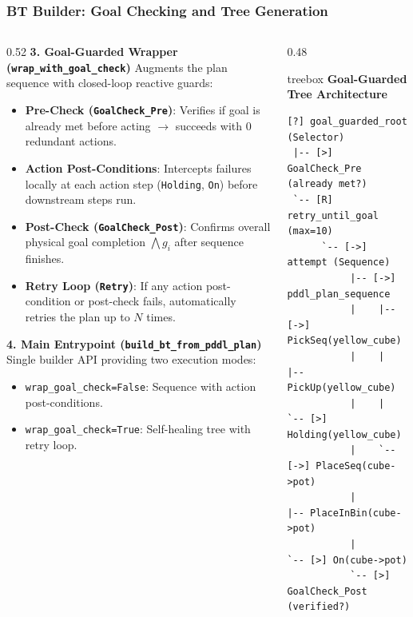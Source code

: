 \documentclass[10pt]{beamer}
\begin{document}
\begin{frame}[fragile]
\frametitle{BT Builder: Goal Checking and Tree Generation}
\begin{columns}[T]
    \begin{column}{0.52\textwidth}
        \small \textbf{3. Goal-Guarded Wrapper (\texttt{wrap\_with\_goal\_check})}
        \scriptsize
        Augments the plan sequence with closed-loop reactive guards:
        \begin{itemize}
            \item \textbf{Pre-Check (\texttt{GoalCheck\_Pre})}: Verifies if goal is already met before acting $\to$ succeeds with $0$ redundant actions.
            \item \textbf{Action Post-Conditions}: Intercepts failures locally at each action step (\texttt{Holding}, \texttt{On}) before downstream steps run.
            \item \textbf{Post-Check (\texttt{GoalCheck\_Post})}: Confirms overall physical goal completion $\bigwedge g_i$ after sequence finishes.
            \item \textbf{Retry Loop (\texttt{Retry})}: If any action post-condition or post-check fails, automatically retries the plan up to $N$ times.
        \end{itemize}

        \vspace{0.10cm}
        \small \textbf{4. Main Entrypoint (\texttt{build\_bt\_from\_pddl\_plan})}
        \scriptsize
        Single builder API providing two execution modes:
        \begin{itemize}
            \item \texttt{wrap\_goal\_check=False}: Sequence with action post-conditions.
            \item \texttt{wrap\_goal\_check=True}: Self-healing tree with retry loop.
        \end{itemize}
    \end{column}

    \begin{column}{0.48\textwidth}
        \begin{beamercolorbox}[sep=4.5pt,rounded=true,shadow=true]{treebox}
            \scriptsize \textbf{Goal-Guarded Tree Architecture}
            \fontsize{4.4pt}{5.1pt}\selectfont
            \begin{verbatim}
[?] goal_guarded_root (Selector)
 |-- [>] GoalCheck_Pre (already met?)
 `-- [R] retry_until_goal (max=10)
      `-- [->] attempt (Sequence)
           |-- [->] pddl_plan_sequence
           |    |-- [->] PickSeq(yellow_cube)
           |    |    |-- PickUp(yellow_cube)
           |    |    `-- [>] Holding(yellow_cube)
           |    `-- [->] PlaceSeq(cube->pot)
           |         |-- PlaceInBin(cube->pot)
           |         `-- [>] On(cube->pot)
           `-- [>] GoalCheck_Post (verified?)
            \end{verbatim}
        \end{beamercolorbox}


\end{column}
\end{columns}
\end{frame}
\end{document}
